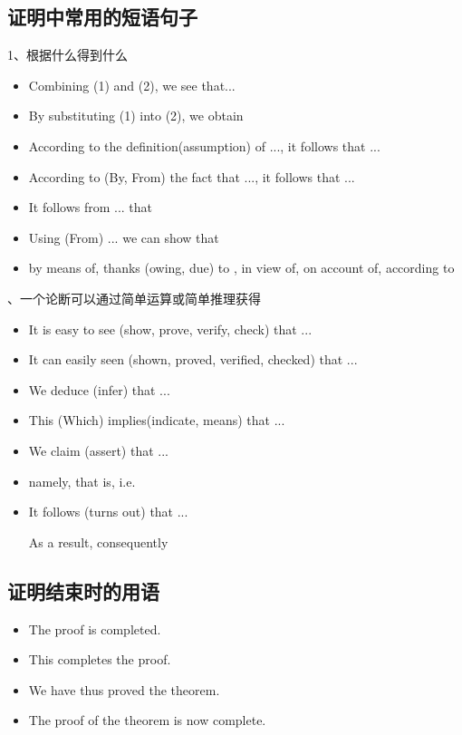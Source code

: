 \documentclass[11pt,final]{article}
\numberwithin{equation}{section}
\begin{document}
\subsection{证明中常用的短语句子}
1、根据什么得到什么
\begin{itemize}
	\item Combining (1) and (2), we see that...
	\item By substituting (1) into (2), we obtain
	\item According to the definition(assumption) of ..., it follows that ...
	\item According to (By, From) the fact that ..., it follows that ...
	\item It follows from ... that 
     \item Using (From) ... we can show that
     \item by means of, thanks (owing, due) to 
, in view of, on account of, according to  
\end{itemize}

、一个论断可以通过简单运算或简单推理获得
\begin{itemize}
	\item It is easy to see (show, prove, verify, check) that ...
	\item It can easily seen (shown, proved, verified, checked) that ...
    \item We deduce (infer) that ...
	\item This (Which) implies(indicate, means) that ...
	\item We claim (assert) that ...
	\item namely, that is, i.e.
	\item It follows (turns out) that ...
	
	As a result, consequently
\end{itemize}

\subsection{证明结束时的用语}
\begin{itemize}
	\item The proof is completed.
	\item This completes the proof.
	\item We have thus proved the theorem.
	\item The proof of the theorem is now complete.
\end{itemize}
\end{document}
